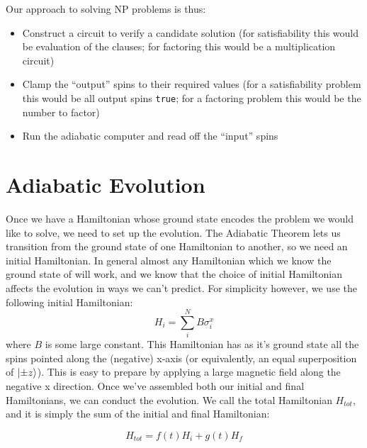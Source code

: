 Our approach to solving NP problems is thus:
\begin{itemize}
	\item Construct a circuit to verify a candidate solution (for satisfiability this would be evaluation of the clauses; for factoring this would be a multiplication circuit)
	\item Clamp the ``output'' spins to their required values (for a satisfiability problem this would be all output spins \texttt{true}; for a factoring problem this would be the number to factor)
	\item Run the adiabatic computer and read off the ``input'' spins
\end{itemize}

\section{Adiabatic Evolution}
Once we have a Hamiltonian whose ground state encodes the problem we would like to solve, we need to set up the evolution.  The Adiabatic Theorem lets us transition from the ground state of one Hamiltonian to another, so we need an initial Hamiltonian.  In general almost any Hamiltonian which we know the ground state of will work, and we know that the choice of initial Hamiltonian affects the evolution in ways we can't predict.  For simplicity however, we use the following initial Hamiltonian:
\begin{displaymath}
	H_i = \sum_i^N B \sigma_i^x
\end{displaymath}
where $B$ is some large constant.  This Hamiltonian has as it's ground state all the spins pointed along the (negative) x-axis (or equivalently, an equal superposition of $\mathinner{|{\pm z}\rangle}$).  This is easy to prepare by applying a large magnetic field along the negative x direction.
Once we've assembled both our initial and final Hamiltonians, we can conduct the evolution.  We call the total Hamiltonian $H_{tot}$, and it is simply the sum of the initial and final Hamiltonian:

\begin{displaymath}
	H_{tot} = f(t)H_i + g(t)H_f
\end{displaymath}

